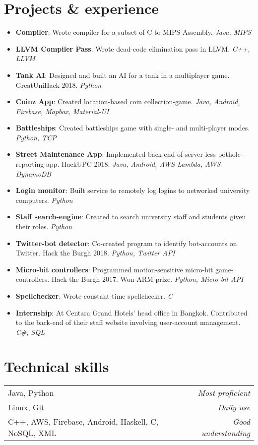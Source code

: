 \documentclass[11pt,a4paper]{article}
\begin{document}
\section*{Projects \& experience}
\begin{itemize}
    \item \textbf{Compiler}:
        Wrote compiler for a subset of C to MIPS-Assembly.
        \textit{Java, MIPS}
    \item \textbf{LLVM Compiler Pass}:
        Wrote dead-code elimination pass in LLVM.
        \textit{C++, LLVM}
    \item \textbf{Tank AI}:
        Designed and built an AI for a tank in a multiplayer game. GreatUniHack 2018.
        \textit{Python}
    \item \textbf{Coinz App}:
        Created location-based coin collection-game.
		\textit{Java, Android, Firebase, Mapbox, Material-UI}
    \item \textbf{Battleships}:
        Created battleships game with single- and multi-player modes.
        \textit{Python, TCP}
    \item \textbf{Street Maintenance App}:
        Implemented back-end of server-less pothole-reporting app. HackUPC 2018.
		\textit{Java, Android, AWS Lambda, AWS DynamoDB}
    \item \textbf{Login monitor}:
        Built service to remotely log logins to networked university computers.
        \textit{Python}
    \item \textbf{Staff search-engine}:
        Created to search university staff and students given their roles.
        \textit{Python}
    \item \textbf{Twitter-bot detector}:
        Co-created program to identify bot-accounts on Twitter. Hack the Burgh 2018.
        \textit{Python, Twitter API}
    \item \textbf{Micro-bit controllers}:
        Programmed motion-sensitive micro-bit game-controllers. Hack the Burgh 2017.
        Won ARM prize.
        \textit{Python, Micro-bit API}
    \item \textbf{Spellchecker}:
        Wrote constant-time spellchecker.
        \textit{C}
    \item \textbf{Internship}:
        At Centara Grand Hotels' head office in Bangkok.
        Contributed to the back-end of their staff website involving user-account management.
        \textit{C\#, SQL} 
\end{itemize}

\hline
\section*{Technical skills}
\begin{tabularx}{\textwidth}{X r}
    Java, Python & \textit{Most proficient} \\
    Linux, Git & \textit{Daily use} \\
    C++, AWS, Firebase, Android, Haskell, C, NoSQL, XML & \textit{Good understanding} \\
\end{tabularx}
\end{document}
